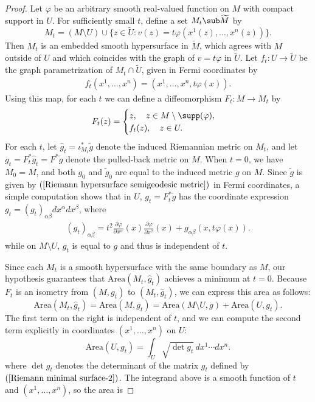 \begin{proof}
Let $\varphi$ be an arbitrary smooth real-valued function on $M$ with compact support in $U$. For sufficiently small $t$, define a set $M_t\sub\widetilde{M}$ by
\[M_t=(M\setminus U)\cup\{z\in\widetilde{U}:v(z)=t\varphi(x^1(z),\dots,x^n(z))\}.\]
Then $M_t$ is an embedded smooth hypersurface in $\widetilde{M}$, which agrees with $M$ outside of $U$ and which coincides with the graph of $v=t\varphi$ in $\widetilde{U}$. 
Let $f_t:U\to\widetilde{U}$ be the graph parametrization of $M_t\cap\widetilde{U}$, given in Fermi coordinates by
\begin{align}\label{Riemann minimal surface-1}
f_t(x^1,\dots,x^n)=(x^1,\dots,x^n,t\varphi(x)).
\end{align}
Using this map, for each $t$ we can define a diffeomorphism $F_t:M\to M_t$ by
\[F_t(z)=\begin{cases}
z,\quad z\in M\setminus\supp(\varphi),\\
f_t(z),\quad z\in U.
\end{cases}\]
For each $t$, let $\hat{g}_t=\iota_{M_t}^*\tilde{g}$ denote the induced Riemannian metric on $M_t$, and let $g_t=F_t^*\hat{g}_t=F^*\tilde{g}$ denote the 
pulled-back metric on $M$. When $t=0$, we have $M_0=M$, and both $g_0$ and $\tilde{g}_0$ are equal to the induced metric $g$ on $M$. Since $\tilde{g}$ is given 
by $(\ref{Riemann hypersurface semigeodesic metric})$ in Fermi coordinates, a simple computation shows that in $U$, $g_t=F_t^*\tilde{g}$ has the coordinate expression $g_t=(g_t)_{\alpha\beta}dx^\alpha dx^\beta$, 
where
\begin{align}\label{Riemann minimal surface-2}
(g_t)_{\alpha\beta}=t^2\frac{\partial \varphi}{\partial x^\alpha}(x)\frac{\partial\varphi}{\partial x^\beta}(x)+g_{\alpha\beta}(x,t\varphi(x)).
\end{align}
while on $M\setminus U$, $g_t$ is equal to $g$ and thus is independent of $t$.\par
Since each $M_t$ is a smooth hypersurface with the same boundary as $M$, our hypothesis guarantees that $\mathrm{Area}(M_t,\hat{g}_t)$ achieves a minimum at $t=0$. 
Because $F_t$ is an isometry from $(M,g_t)$ to $(M_t,\hat{g}_t)$, we can express this area as follows:
\[\mathrm{Area}(M_t,\hat{g}_t)=\mathrm{Area}(M,g_t)=\mathrm{Area}(M\setminus U,g)+\mathrm{Area}(U,g_t).\]
The first term on the right is independent of $t$, and we can compute the second term explicitly in coordinates $(x^1,\dots,x^n)$ on $U$:
\[\mathrm{Area}(U,g_t)=\int_U\sqrt{\det g_t}\,dx^1\cdots dx^n.\]
where $\det g_t$ denotes the determinant of the matrix $g_t$ defined by $(\ref{Riemann minimal surface-2})$. The integrand above is a smooth function of $t$ and $(x^1,\dots,x^n)$, so the area is 

\end{proof}

